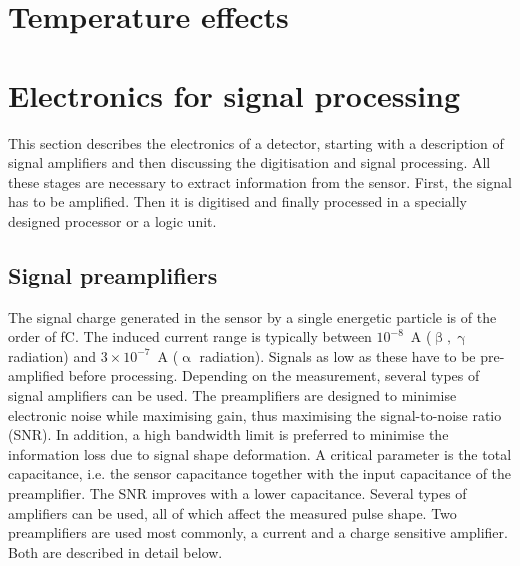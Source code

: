 \section{Temperature effects}













\section{Electronics for signal processing} %
\label{sec:elecsigproc}
This section describes the electronics of a detector, starting with a description of signal amplifiers and then discussing the digitisation and signal processing. All these stages are necessary to extract information from the sensor. First, the signal has to be amplified. Then it is digitised and finally processed in a specially designed processor or a logic unit.

\subsection{Signal preamplifiers}
The signal charge generated in the sensor by a single energetic particle is of the order of fC. The induced current range is typically between $10^{-8}$~A ($\upbeta, \upgamma$ radiation) and $3\times10^{-7}$~A ($\upalpha$ radiation). Signals as low as these have to be pre-amplified before processing. Depending on the measurement, several types of signal amplifiers can be used. The preamplifiers are designed to minimise electronic noise while maximising gain, thus maximising the signal-to-noise ratio (SNR). In addition, a high bandwidth limit is preferred to minimise the information loss due to signal shape deformation. A critical parameter is the total capacitance, i.e. the sensor capacitance together with the input capacitance of the preamplifier. The SNR improves with a lower capacitance. Several types of amplifiers can be used, all of which affect the measured pulse shape. Two preamplifiers are used most commonly, a current and a charge sensitive amplifier. Both are described in detail below. 


